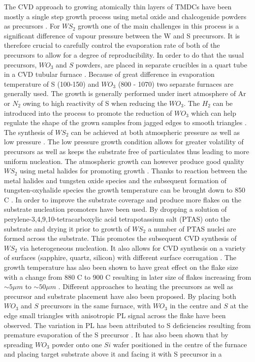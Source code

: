 The CVD approach to growing atomically thin layers of TMDCs have been mostly a single step growth process using metal oxide and chalcogenide powders as precursors \cite{Reale2016}\cite{doi:10.1021/nn4046002}\cite{Cong2013}\cite{Rong2014}\cite{Dumcenco2015}\cite{Lee2012}\cite{Ling2014}\cite{Najmaei2013}\cite{Ji2013}\cite{Zhang2014a}\cite{Yu2013}. For $WS_2$ growth one of the main challenges in this process is a significant difference of vapour pressure between the W and S precursors. It is therefore crucial to carefully control the evaporation rate of both of the precursors to allow for a degree of reproducibility. In order to do that the usual precursors, $WO_3$ and $S$ powders, are placed in separate crucibles in a quart tube in a CVD tubular furnace \cite{Bosi2015}\cite{Shi2015}. Because of great difference in evaporation temperature of S (100-150{\degree}) and $WO_3$ (800 - 1070{\degree}) two separate furnaces are generally used. The growth is generally performed under inert atmosphere of Ar or $N_2$ owing to high reactivity of S when reducing the $WO_3$. The $H_2$ can be introduced into the process to promote the reduction of $WO_3$ which can help regulate the shape of the grown samples from jagged edges to smooth triangles \cite{doi:10.1021/nn403454e}. The synthesis of $WS_2$ can be achieved at both atmospheric pressure as well as low pressure \cite{Bosi2015}\cite{Shi2015}. The low pressure growth condition allows for greater volatility of precursors as well as keeps the substrate free of particulates thus leading to more uniform nucleation. The atmospheric growth can however produce good quality $WS_2$ using metal halides for promoting growth \cite{Li2015}. Thanks to reaction between the metal halides and tungsten oxide species and the subsequent formation of tungsten-oxyhalide species the growth temperature can be brought down to 850 {\degree}C \cite{Li2015}. In order to improve the substrate coverage and produce more flakes on the substrate nucleation promoters have been used. By dropping a solution of perylene-3,4,9,10-tetracarboxylic acid tetrapotassium salt (PTAS) onto the substrate and drying it prior to growth of $WS_2$ a number of PTAS nuclei are formed across the substrate. This promotes the subsequent CVD synthesis of $WS_2$ via heterogeneous nucleation. It also allows for CVD synthesis on a variety of surfaces (sapphire, quartz, silicon) with different surface corrugation \cite{Lee2013}. The growth temperature has also been shown to have great effect on the flake size with a change from 880 {\degree}C to 900 {\degree}C resulting in later size of flakes increasing from $\sim 5 \mu m$ to $\sim 50 \mu m$ \cite{doi:10.1021/nn403454e}. Different approaches to heating the precursors as well as precursor and substrate placement have also been proposed. By placing both $WO_3$ and $S$ precursors in the same furnace, with $WO_3$ in the centre and $S$ at the edge small triangles with anisotropic PL signal across the flake have been observed. The variation in PL has been attributed to S deficiencies resulting from premature evaporation of the S precursor \cite{doi:10.1021/nn4046002}. It has also been shown that by spreading $WO_3$ powder onto one $Si$ wafer positioned in the centre of the furnace and placing target substrate above it and facing it with S precursor in a 